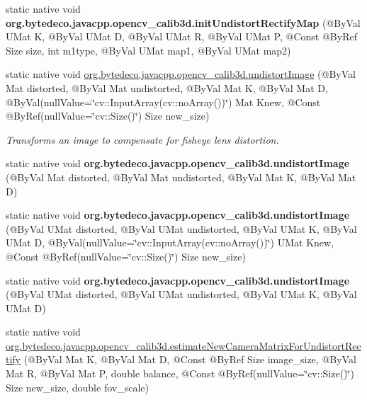 \begin{DoxyCompactItemize}
\mbox{\label{group__calib3d__fisheye_ga2f280f2b2cd4e8250fb0d58fc48491b7}} 
static native void {\bfseries org.\+bytedeco.\+javacpp.\+opencv\+\_\+calib3d.\+init\+Undistort\+Rectify\+Map} (@By\+Val U\+Mat K, @By\+Val U\+Mat D, @By\+Val U\+Mat R, @By\+Val U\+Mat P, @Const @By\+Ref Size size, int m1type, @By\+Val U\+Mat map1, @By\+Val U\+Mat map2)
\item 
static native void \hyperlink{group__calib3d__fisheye_gaf721f1f961fe6feedb9ff6a1fc1b169d}{org.\+bytedeco.\+javacpp.\+opencv\+\_\+calib3d.\+undistort\+Image} (@By\+Val Mat distorted, @By\+Val Mat undistorted, @By\+Val Mat K, @By\+Val Mat D, @By\+Val(null\+Value=\char`\"{}cv\+::\+Input\+Array(cv\+::no\+Array())\char`\"{}) Mat Knew, @Const @By\+Ref(null\+Value=\char`\"{}cv\+::\+Size()\char`\"{}) Size new\+\_\+size)
\begin{DoxyCompactList}\small\item\em Transforms an image to compensate for fisheye lens distortion. \end{DoxyCompactList}\item 
\mbox{\label{group__calib3d__fisheye_ga76e03bba1fd19620bd1df63ab66a91ef}} 
static native void {\bfseries org.\+bytedeco.\+javacpp.\+opencv\+\_\+calib3d.\+undistort\+Image} (@By\+Val Mat distorted, @By\+Val Mat undistorted, @By\+Val Mat K, @By\+Val Mat D)
\item 
\mbox{\label{group__calib3d__fisheye_gaef1c1b4181ae62ec0c0b7861cb857d4f}} 
static native void {\bfseries org.\+bytedeco.\+javacpp.\+opencv\+\_\+calib3d.\+undistort\+Image} (@By\+Val U\+Mat distorted, @By\+Val U\+Mat undistorted, @By\+Val U\+Mat K, @By\+Val U\+Mat D, @By\+Val(null\+Value=\char`\"{}cv\+::\+Input\+Array(cv\+::no\+Array())\char`\"{}) U\+Mat Knew, @Const @By\+Ref(null\+Value=\char`\"{}cv\+::\+Size()\char`\"{}) Size new\+\_\+size)
\item 
\mbox{\label{group__calib3d__fisheye_ga7846c1dcc6c5f8a7ef342de69c7855f2}} 
static native void {\bfseries org.\+bytedeco.\+javacpp.\+opencv\+\_\+calib3d.\+undistort\+Image} (@By\+Val U\+Mat distorted, @By\+Val U\+Mat undistorted, @By\+Val U\+Mat K, @By\+Val U\+Mat D)
\item 
static native void \hyperlink{group__calib3d__fisheye_ga0ec51dc3cf450ad76b96b9b719237f2b}{org.\+bytedeco.\+javacpp.\+opencv\+\_\+calib3d.\+estimate\+New\+Camera\+Matrix\+For\+Undistort\+Rectify} (@By\+Val Mat K, @By\+Val Mat D, @Const @By\+Ref Size image\+\_\+size, @By\+Val Mat R, @By\+Val Mat P, double balance, @Const @By\+Ref(null\+Value=\char`\"{}cv\+::\+Size()\char`\"{}) Size new\+\_\+size, double fov\+\_\+scale)

\end{DoxyCompactItemize}
